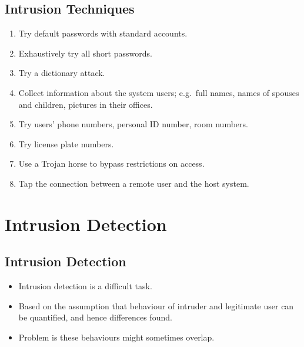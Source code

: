 \subsection{Intrusion Techniques}

\begin{frame}
  \begin{enumerate}
    \item Try default passwords with standard accounts.
    \item Exhaustively try all short passwords.
    \item Try a dictionary attack.
    \item Collect information about the system users; e.g.\ full names, names 
      of spouses and children, pictures in their offices.
    \item Try users' phone numbers, personal ID number, room numbers.
    \item Try license plate numbers.
    \item Use a Trojan horse to bypass restrictions on access.
    \item Tap the connection between a remote user and the host system.
  \end{enumerate}
\end{frame}


\section{Intrusion Detection}

\subsection{Intrusion Detection}

\begin{frame}
  \begin{itemize}
    \item Intrusion detection is a difficult task.

    \item Based on the assumption that behaviour of intruder and legitimate 
      user can be quantified, and hence differences found.

    \item Problem is these behaviours might sometimes overlap.

  \end{itemize}
\end{frame}

